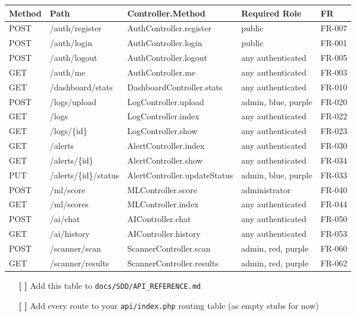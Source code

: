 \documentclass[11pt,a4paper]{report}
\newcommand{\todo}{\textcolor{helixamber}{\textbf{[ ]}}}
\newcommand{\filepath}[1]{\texttt{\small#1}}
\begin{document}
\begin{center}
\begin{tabular}{C{1.5cm} L{3.5cm} L{3.5cm} L{3cm} C{1.5cm}}
    \toprule
    \textbf{Method} & \textbf{Path} & \textbf{Controller.Method} & \textbf{Required Role} & \textbf{FR} \\
    \midrule
    POST & /auth/register & AuthController.register & public & FR-007 \\
    POST & /auth/login & AuthController.login & public & FR-001 \\
    POST & /auth/logout & AuthController.logout & any authenticated & FR-005 \\
    GET & /auth/me & AuthController.me & any authenticated & FR-003 \\
    GET & /dashboard/stats & DashboardController.stats & any authenticated & FR-010 \\
    POST & /logs/upload & LogController.upload & admin, blue, purple & FR-020 \\
    GET & /logs & LogController.index & any authenticated & FR-022 \\
    GET & /logs/\{id\} & LogController.show & any authenticated & FR-023 \\
    GET & /alerts & AlertController.index & any authenticated & FR-030 \\
    GET & /alerts/\{id\} & AlertController.show & any authenticated & FR-034 \\
    PUT & /alerts/\{id\}/status & AlertController.updateStatus & admin, blue, purple & FR-033 \\
    POST & /ml/score & MLController.score & administrator & FR-040 \\
    GET & /ml/scores & MLController.index & any authenticated & FR-044 \\
    POST & /ai/chat & AIController.chat & any authenticated & FR-050 \\
    GET & /ai/history & AIController.history & any authenticated & FR-053 \\
    POST & /scanner/scan & ScannerController.scan & admin, red, purple & FR-060 \\
    GET & /scanner/results & ScannerController.results & admin, red, purple & FR-062 \\
    \bottomrule
\end{tabular}
\end{center}

\begin{itemize}
    \item[\todo] Add this table to \filepath{docs/SDD/API\_REFERENCE.md}
    \item[\todo] Add every route to your \filepath{api/index.php} routing table (as empty stubs for now)
\end{itemize}
\end{document}
